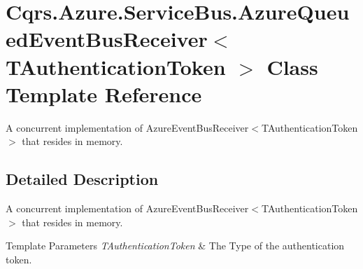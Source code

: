 \hypertarget{classCqrs_1_1Azure_1_1ServiceBus_1_1AzureQueuedEventBusReceiver}{}\section{Cqrs.\+Azure.\+Service\+Bus.\+Azure\+Queued\+Event\+Bus\+Receiver$<$ T\+Authentication\+Token $>$ Class Template Reference}
\label{classCqrs_1_1Azure_1_1ServiceBus_1_1AzureQueuedEventBusReceiver}


A concurrent implementation of Azure\+Event\+Bus\+Receiver$<$\+T\+Authentication\+Token$>$ that resides in memory.  




\subsection{Detailed Description}
A concurrent implementation of Azure\+Event\+Bus\+Receiver$<$\+T\+Authentication\+Token$>$ that resides in memory. 


\begin{DoxyTemplParams}{Template Parameters}
{\em T\+Authentication\+Token} & The Type of the authentication token.\\
\hline
\end{DoxyTemplParams}
